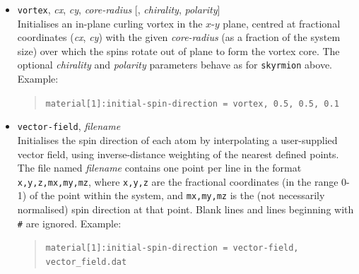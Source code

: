 \begin{itemize}
\item \verb|vortex|, \emph{cx}, \emph{cy}, \emph{core-radius} [, \emph{chirality}, \emph{polarity}] \\
Initialises an in-plane curling vortex in the $x$-$y$ plane, centred at fractional coordinates (\emph{cx}, \emph{cy}) with the given \emph{core-radius} (as a fraction of the system size) over which the spins rotate out of plane to form the vortex core. The optional \emph{chirality} and \emph{polarity} parameters behave as for \verb|skyrmion| above. Example:
\begin{quote}
\verb|material[1]:initial-spin-direction = vortex, 0.5, 0.5, 0.1|
\end{quote}

\item \verb|vector-field|, \emph{filename} \\
Initialises the spin direction of each atom by interpolating a user-supplied vector field, using inverse-distance weighting of the nearest defined points. The file named \emph{filename} contains one point per line in the format \verb|x,y,z,mx,my,mz|, where \verb|x,y,z| are the fractional coordinates (in the range 0-1) of the point within the system, and \verb|mx,my,mz| is the (not necessarily normalised) spin direction at that point. Blank lines and lines beginning with \verb|#| are ignored. Example:
\begin{quote}
\verb|material[1]:initial-spin-direction = vector-field, vector_field.dat|
\end{quote}

\end{itemize}

